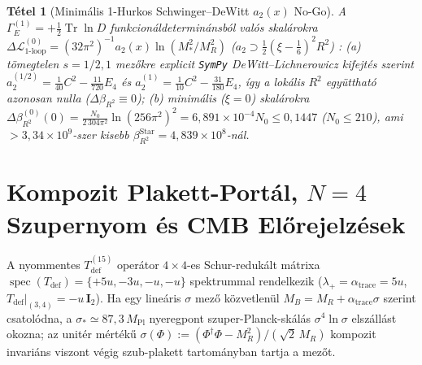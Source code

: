 \documentclass[11pt,a4paper]{article}
\newtheorem{theorem}{Tétel}[section]
\begin{document}
\begin{theorem}[Minimális 1-Hurkos Schwinger--DeWitt \texorpdfstring{$a_2(x)$}{a2(x)} No-Go]
\label{thm:a2-nogo}
A $\Gamma_E^{(1)} = +\frac{1}{2}\operatorname{Tr}\ln D$ funkcionáldeterminánsból valós skalárokra $\Delta\mathcal{L}_{\mathrm{1\text{-}loop}}^{(0)} = (32\pi^2)^{-1}a_2(x)\ln(M_*^2/M_R^2)$ ($a_2 \supset \frac{1}{2}(\xi-\frac{1}{6})^2 R^2$) \cite{BirrellDavies1982}: (a) tömegtelen $s=1/2, 1$ mezőkre explicit \texttt{SymPy} DeWitt--Lichnerowicz kifejtés szerint $a_2^{(1/2)} = \frac{1}{40}C^2 - \frac{11}{720}E_4$ és $a_2^{(1)} = \frac{1}{10}C^2 - \frac{31}{180}E_4$, így a lokális $R^2$ együttható azonosan nulla ($\Delta\beta_{R^2} \equiv 0$); (b) minimális ($\xi=0$) skalárokra $\Delta\beta_{R^2}^{(0)}(0) = \frac{N_0}{2\,304\pi^2}\ln(256\pi^2)^2 = 6{,}891\times 10^{-4}N_0 \le 0{,}1447$ ($N_0 \le 210$), ami $>3{,}34\times 10^9$-szer kisebb $\beta_{R^2}^{\mathrm{Star}} = 4{,}839\times 10^8$-nál.
\end{theorem}

\section{Kompozit Plakett-Portál, \texorpdfstring{$N = 4$}{N = 4} Szupernyom és CMB Előrejelzések}
\label{sec:inflation}

A nyommentes $T_{\mathrm{def}}^{(15)}$ operátor $4\times 4$-es Schur-redukált mátrixa $\operatorname{spec}(T_{\mathrm{def}}) = \{+5u, -3u, -u, -u\}$ spektrummal rendelkezik ($\lambda_+ = \alpha_{\mathrm{trace}} = 5u$, $T_{\mathrm{def}}|_{(3,4)} = -u\,\mathbf{I}_2$). Ha egy lineáris $\sigma$ mező közvetlenül $M_B = M_R + \alpha_{\mathrm{trace}}\sigma$ szerint csatolódna, a $\sigma_* \simeq 87{,}3\,M_{\mathrm{Pl}}$ nyeregpont szuper-Planck-skálás $\sigma^4\ln\sigma$ elszállást okozna; az unitér mértékű $\sigma(\Phi) := (\Phi^\dagger\Phi - M_R^2)/(\sqrt{2}\,M_R)$ kompozit invariáns viszont végig szub-plakett tartományban tartja a mezőt.
\end{document}
